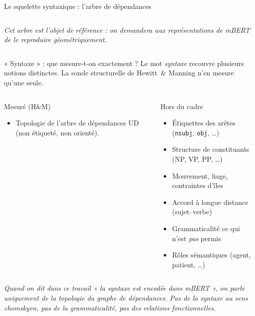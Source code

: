 \documentclass[aspectratio=169,11pt]{beamer}
\newcommand{\mbert}{m\textsc{BERT}\xspace}
\begin{document}
\begin{frame}{Le squelette syntaxique : l'arbre de d\'ependances}
\begin{columns}[T]
    \vspace{0.4cm}
    {\footnotesize\color{midgray}\itshape
    Cet arbre est l'objet de r\'ef\'erence : on demandera aux
    repr\'esentations de \mbert{} de le reproduire g\'eom\'etriquement.}
  \end{columns}
\end{frame}

\begin{frame}{« Syntaxe » : que mesure-t-on exactement ?}
  \vspace{0.2cm}
  Le mot \emph{syntaxe} recouvre plusieurs notions distinctes.
  La sonde structurelle de Hewitt~\& Manning n'en mesure
  \alert{qu'une seule}.

  \vspace{0.5cm}
  \begin{columns}[T]
    \begin{block}{\color{accent}Mesur\'e (H\&M)}
      \vspace{0.1cm}
      \begin{itemize}\setlength\itemsep{4pt}
        \item Topologie de l'arbre de d\'ependances UD
              (non \'etiquet\'e, non orient\'e).
      \end{itemize}
      \vspace{1.6cm}
    \end{block}

    \begin{block}{\color{midgray}Hors du cadre}
      \vspace{0.1cm}
      \begin{itemize}\setlength\itemsep{2pt}
        \item \'Etiquettes des ar\^etes
              (\texttt{nsubj}, \texttt{obj}, \ldots)
        \item Structure de constituants (NP, VP, PP, \ldots)
        \item Mouvement, liage, contraintes d'\^iles
        \item Accord \`a longue distance (sujet--verbe)
        \item Grammaticalit\'e \textemdash{} ce qui n'est \emph{pas} permis
        \item R\^oles s\'emantiques (agent, patient, \ldots)
      \end{itemize}
    \end{block}
  \end{columns}

  \vspace{0.5cm}
  \small\itshape
  Quand on dit dans ce travail « la syntaxe est encod\'ee dans \mbert{} »,
  on parle uniquement de la \alert{topologie du graphe de d\'ependances}.
  Pas de la syntaxe au sens chomskyen, pas de la grammaticalit\'e,
  pas des relations fonctionnelles.
\end{frame}
\end{document}
